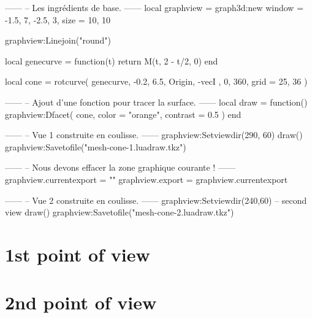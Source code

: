 \documentclass[varwidth]{standalone}
\begin{document}
\begin{luadraw}{}
------
-- Les ingrédients de base.
------
local graphview = graph3d:new{
  window = {-1.5, 7, -2.5, 3},
  size   = {10, 10}
}

graphview:Linejoin("round")

local genecurve = function(t)
  return M(t, 2 - t/2, 0)
end

local cone = rotcurve(
  genecurve, -0.2, 6.5,
  {
    Origin, -vecI
  },
  0, 360,
  {
    grid = {25, 36}
  })

------
-- Ajout d'une fonction pour tracer la surface.
------
local draw = function()
  graphview:Dfacet(
    cone,
    {
      color  = "orange",
      contrast = 0.5
    })
end

------
-- Vue 1 construite en coulisse.
------
graphview:Setviewdir(290, 60)
draw()
graphview:Savetofile("mesh-cone-1.luadraw.tkz")

------
-- Nous devons effacer la zone graphique courante !
------
graphview.currentexport = {""}
graphview.export        = graphview.currentexport

------
-- Vue 2 construite en coulisse.
------
graphview:Setviewdir(240,60) -- second view
draw()
graphview:Savetofile("mesh-cone-2.luadraw.tkz")
\end{luadraw}

\section*{1st point of view}




\section*{2nd point of view}


\end{document}
